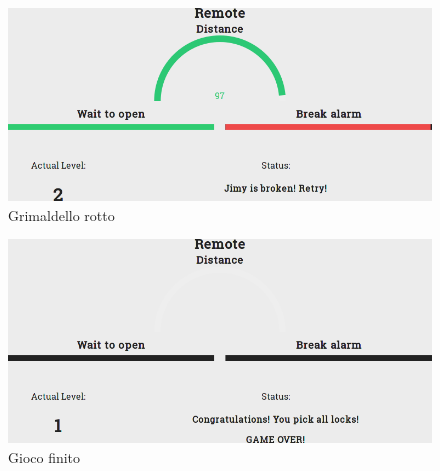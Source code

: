 \begin{figure}[!ht]
	\centering
	\includegraphics[scale=.4]{img/testing/game4.png}
	\caption{Grimaldello rotto}
\end{figure}

\begin{figure}[!ht]
	\centering
	\includegraphics[scale=.4]{img/testing/game5.png}
	\caption{Gioco finito}
\end{figure}

